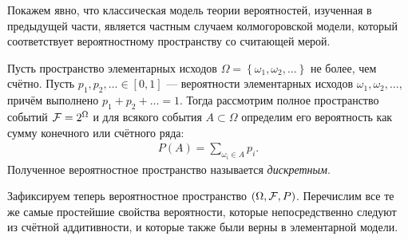 \documentclass[../main.tex]{subfiles}
\begin{document}
Покажем явно, что классическая модель теории вероятностей, изученная в предыдущей части, является частным случаем колмогоровской модели, который соответствует вероятностному пространству со считающей мерой.

\begin{exmpl}
 Пусть пространство элементарных исходов $\Omega = \left\{ \omega_1, \omega_2, \ldots \right\}$ не более, чем счётно. Пусть $p_1, p_2, \ldots \in [0,1]$ --- вероятности элементарных исходов $\omega_1, \omega_2, \ldots$, причём выполнено $p_1 + p_2 + \ldots  = 1$. Тогда рассмотрим полное пространство событий $\mathcal F = 2^{\Omega}$ и для всякого события $A \subset \Omega$ определим его вероятность как сумму конечного или счётного ряда:
 \begin{align*}
  P(A) = \sum_{\omega_i \in A} p_i.
 \end{align*} Полученное вероятностное пространство называется \textit{дискретным}.
\end{exmpl}

Зафиксируем теперь вероятностное пространство $(\Omega, \mathcal F, P)$. Перечислим все те же самые простейшие свойства вероятности, которые непосредственно следуют из счётной аддитивности, и которые также были верны в элементарной модели.
\end{document}
